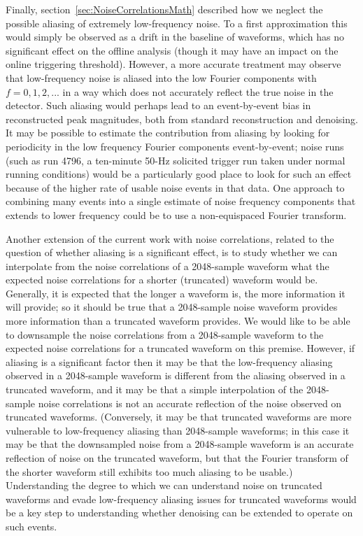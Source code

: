 Finally, section~\ref{sec:NoiseCorrelationsMath} described how we neglect the possible aliasing of extremely low-frequency noise.  To a first approximation this would simply be observed as a drift in the baseline of waveforms, which has no significant effect on the offline analysis (though it may have an impact on the online triggering threshold).  However, a more accurate treatment may observe that low-frequency noise is aliased into the low Fourier components with $f = 0, 1, 2, ...$ in a way which does not accurately reflect the true noise in the detector.  Such aliasing would perhaps lead to an event-by-event bias in reconstructed peak magnitudes, both from standard reconstruction and denoising.  It may be possible to estimate the contribution from aliasing by looking for periodicity in the low frequency Fourier components event-by-event; noise runs (such as run 4796, a ten-minute 50-Hz solicited trigger run taken under normal running conditions) would be a particularly good place to look for such an effect because of the higher rate of usable noise events in that data.  One approach to combining many events into a single estimate of noise frequency components that extends to lower frequency could be to use a non-equispaced Fourier transform.~\cite{Keiner:2009:UNS:1555386.1555388}

Another extension of the current work with noise correlations, related to the question of whether aliasing is a significant effect, is to study whether we can interpolate from the noise correlations of a 2048-sample waveform what the expected noise correlations for a shorter (truncated) waveform would be.  Generally, it is expected that the longer a waveform is, the more information it will provide; so it should be true that a 2048-sample noise waveform provides more information than a truncated waveform provides.  We would like to be able to downsample the noise correlations from a 2048-sample waveform to the expected noise correlations for a truncated waveform on this premise.  However, if aliasing is a significant factor then it may be that the low-frequency aliasing observed in a 2048-sample waveform is different from the aliasing observed in a truncated waveform, and it may be that a simple interpolation of the 2048-sample noise correlations is not an accurate reflection of the noise observed on truncated waveforms.  (Conversely, it may be that truncated waveforms are more vulnerable to low-frequency aliasing than 2048-sample waveforms; in this case it may be that the downsampled noise from a 2048-sample waveform is an accurate reflection of noise on the truncated waveform, but that the Fourier transform of the shorter waveform still exhibits too much aliasing to be usable.)  Understanding the degree to which we can understand noise on truncated waveforms and evade low-frequency aliasing issues for truncated waveforms would be a key step to understanding whether denoising can be extended to operate on such events.

